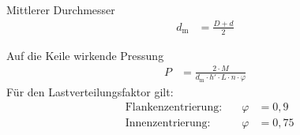 \begin{eeqn}{Mittlerer Durchmesser}
	\begin{align}
		d_\text{m} &= \frac{D+d}{2}
	\end{align}
\end{eeqn}

\begin{eeqn}{Auf die Keile wirkende Pressung}
	\begin{align}
		P &= \frac{2\cdot M}{d_\text{m} \cdot h' \cdot L \cdot n \cdot \varphi}
	\end{align}
	Für den Lastverteilungsfaktor gilt:
	\begin{align*}
		&\text{Flankenzentrierung}: \quad &\varphi &=0,9\\
		&\text{Innenzentrierung}: \quad &\varphi &=0,75\\
	\end{align*}
\end{eeqn}
